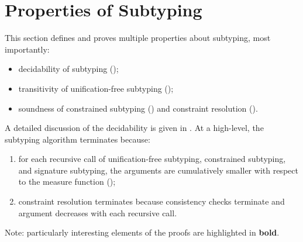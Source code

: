 \section{Properties of Subtyping}\label{sec:dec-sub:proofs}

This section defines and proves multiple properties about subtyping,
most importantly:
\begin{itemize}
    \item decidability of subtyping ();
    \item transitivity of unification-free subtyping ();
    \item soundness of constrained subtyping () 
        and constraint resolution ().
\end{itemize}

A detailed discussion of the decidability is given in .
At a high-level, the subtyping algorithm terminates because:
\begin{enumerate}
    \item for each recursive call of unification-free subtyping, 
        constrained subtyping, and signature subtyping, the arguments are
        cumulatively smaller with respect to the measure function
        ();
    \item constraint resolution terminates because consistency checks terminate
        and \UEnv argument decreases with each recursive call.
\end{enumerate}

Note: particularly interesting elements of the proofs are highlighted
in \textbf{bold}.



